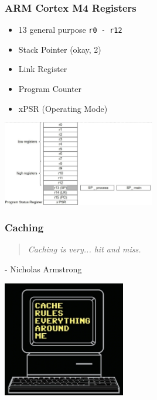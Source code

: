 \begin{frame}
\frametitle{ARM Cortex M4 Registers}
\vspace{6em}

\begin{multicols}{2}
\begin{itemize}
	\item 13 general purpose \texttt{r0 - r12}
	\item Stack Pointer (okay, 2)
	\item Link Register
	\item Program Counter
	\item xPSR (Operating Mode)
\end{itemize}
\columnbreak

\begin{center}
  \includegraphics[width=0.5\textwidth]{images/m4registers.png}
\end{center}
\end{multicols}

\end{frame}


\begin{frame}
\frametitle{Caching}

\vspace{5em}

\begin{quote}
\textit{Caching is very... hit and miss.}
\end{quote}
\hfill - Nicholas Armstrong

\begin{center}
	\includegraphics[width=0.4\textwidth]{images/cacherules.jpg}
\end{center}

\end{frame}

